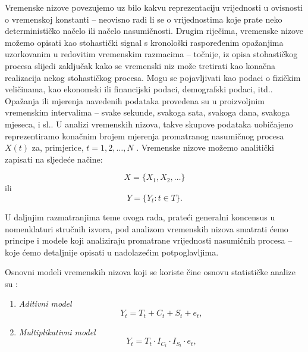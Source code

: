 \documentclass[a4paper,12pt,oneside]{memoir}
\begin{document}
                Vremenske nizove povezujemo uz bilo kakvu reprezentaciju vrijednosti u ovisnosti o vremenskoj konstanti -- neovisno radi li se o vrijednostima koje prate neko determinističko načelo ili načelo nasumičnosti. Drugim riječima, vremenske nizove možemo opisati kao stohastički signal s kronološki raspoređenim opažanjima uzorkovanim u redovitim vremenskim razmacima -- točnije, iz opisa stohastičkog procesa slijedi zaključak kako se vremenski niz može tretirati kao konačna realizacija nekog stohastičkog procesa. Mogu se pojavljivati kao podaci o fizičkim veličinama, kao ekonomski ili financijski podaci, demografski podaci, itd.. Opažanja ili mjerenja navedenih podataka provedena su u proizvoljnim vremenskim intervalima -- svake sekunde, svakoga sata, svakoga dana, svakoga mjeseca, i sl.. U analizi vremenskih nizova, takve skupove podataka uobičajeno reprezentiramo konačnim brojem mjerenja promatranog nasumičnog procesa $X(t)$ za, primjerice, $t=1,2,\ldots,N$ \cite{Priestley}. Vremenske nizove možemo analitički zapisati na sljedeće načine:

                \begin{equation}
                    X=\{X_1,X_2,\ldots\}
                \end{equation}
                ili
                \begin{equation}
                    Y=\{Y_t: t\in T\}.
                \end{equation}
                
                U daljnjim razmatranjima teme ovoga rada, prateći generalni koncensus u nomenklaturi stručnih izvora, pod analizom vremenskih nizova smatrati ćemo principe i modele koji analiziraju promatrane vrijednosti nasumičnih procesa -- koje ćemo detaljnije opisati u nadolazećim potpoglavljima.

                Osnovni modeli vremenskih nizova koji se koriste čine osnovu statističke analize su \cite{Bahovec}:

                \begin{enumerate}
                    \item \textit{Aditivni model} \\
                        \begin{equation}
                            Y_t=T_t+C_t+S_t+e_t,
                        \end{equation}
                    \item \textit{Multiplikativni model} \\
                        \begin{equation}
                            Y_t=T_t\cdot I_{C_t}\cdot I_{S_t}\cdot e_t,
                        \end{equation}
                \end{enumerate}
\end{document}
